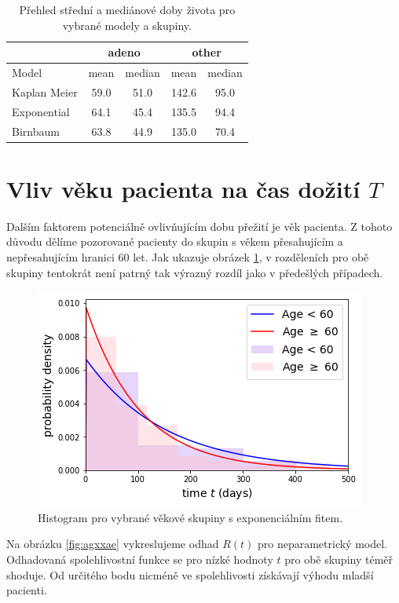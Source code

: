 \documentclass[10pt]{article}
\begin{document}
\begin{table}[htb!]
\centering
\begin{tabular}{lcccc}
 &  \multicolumn{2}{c}{adeno} & \multicolumn{2}{c}{other} \\ 
\toprule
Model & mean & median & mean & median \\
\midrule
Kaplan Meier & 59.0 & 51.0 & 142.6 & 95.0 \\
Exponential & 64.1 & 45.4 & 135.5 & 94.4 \\
Birnbaum & 63.8 & 44.9 & 135.0 & 70.4\\
\end{tabular}
\caption{Přehled střední a mediánové doby života pro vybrané modely a skupiny.}\label{tab:adeno}
\end{table}


\section{Vliv věku pacienta na čas dožití $T$}
Dalším faktorem potenciálně ovlivňujícím dobu přežití je věk pacienta. Z tohoto důvodu dělíme pozorované pacienty do skupin s věkem přesahujícím a nepřesahujícím hranici 60 let. Jak ukazuje obrázek \ref{fig:karexasdp}, v rozděleních pro obě skupiny tentokrát není patrný tak výrazný rozdíl jako v předešlých případech.
  \begin{figure}[htb!]
\centering
\includegraphics[width=.6\textwidth]{Images/age/histexp.png}
  \caption{Histogram pro vybrané věkové skupiny s exponenciálním fitem.}\label{fig:karexasdp} 
   \end{figure}    
Na obrázku \ref{fig:agxxae} vykreslujeme odhad $R(t)$ pro neparametrický model. Odhadovaná spolehlivostní funkce se pro nízké hodnoty $t$ pro obě skupiny téměř shoduje. Od určitého bodu nicméně ve spolehlivosti získávají výhodu mladší pacienti. 
\end{document}

